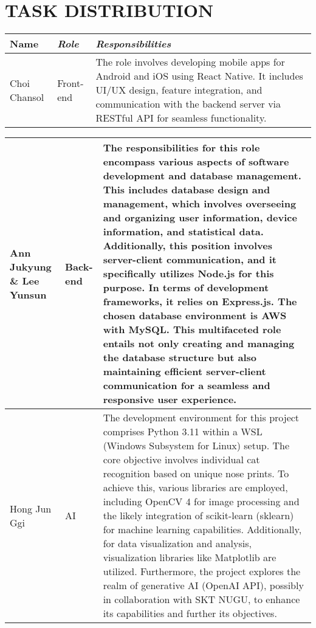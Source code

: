 \documentclass[conference]{IEEEtran}
\begin{document}
\section{TASK DISTRIBUTION}
\begin{table}[!htbp]\normalsize
\begin{center}
\begin{tabular}{|p{1.2cm}|p{1.9cm}|p{4.5cm}|}
\hline
\textbf{Name} & \textbf{\textit{Role}}& \textbf{\textit{Responsibilities}}\\
\hline
Choi Chansol & Front-end &
The role involves developing mobile apps for Android and iOS using React Native. It includes UI/UX design, feature integration, and communication with the backend server via RESTful API for seamless functionality.
\\ \hline
\end{tabular}
\label{tab1}
\end{center}
\end{table}
\newpage
\begin{table}[!htbp]\normalsize
\begin{center}
\begin{tabular}{|p{1.2cm}|p{1.9cm}|p{4.5cm}|}
\hline
Ann Jukyung \& Lee Yunsun & Back-end &
The responsibilities for this role encompass various aspects of software development and database management. This includes database design and management, which involves overseeing and organizing user information, device information, and statistical data. Additionally, this position involves server-client communication, and it specifically utilizes Node.js for this purpose. In terms of development frameworks, it relies on Express.js. The chosen database environment is AWS with MySQL. This multifaceted role entails not only creating and managing the database structure but also maintaining efficient server-client communication for a seamless and responsive user experience.
\\ \hline
Hong Jun Ggi & AI &
The development environment for this project comprises Python 3.11 within a WSL (Windows Subsystem for Linux) setup. The core objective involves individual cat recognition based on unique nose prints. To achieve this, various libraries are employed, including OpenCV 4 for image processing and the likely integration of scikit-learn (sklearn) for machine learning capabilities. Additionally, for data visualization and analysis, visualization libraries like Matplotlib are utilized. Furthermore, the project explores the realm of generative AI (OpenAI API), possibly in collaboration with SKT NUGU, to enhance its capabilities and further its objectives.
\\ \hline
\end{tabular}
\label{tab2}
\end{center}
\end{table}
\end{document}
